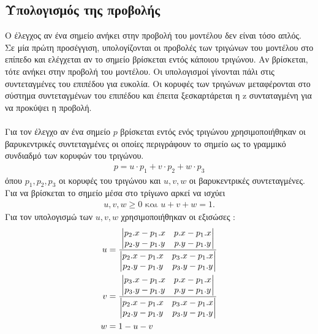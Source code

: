 \documentclass{report}
\begin{document}

\subsection{Υπολογισμός της προβολής}
Ο έλεγχος αν ένα σημείο ανήκει στην προβολή του μοντέλου δεν είναι τόσο απλός. Σε μία πρώτη προσέγγιση, υπολογίζονται οι προβολές των τριγώνων
του μοντέλου στο επίπεδο και ελέγχεται αν το σημείο βρίσκεται εντός κάποιου τριγώνου. Αν βρίσκεται, τότε ανήκει στην προβολή του μοντέλου.
Οι υπολογισμοί γίνονται πάλι στις συντεταγμένες του επιπέδου για ευκολία. Οι κορυφές των τριγώνων μεταφέρονται στο σύστημα συντεταγμένων
του επιπέδου και έπειτα ξεσκαρτάρεται η z συνταταγμένη για να προκύψει η προβολή.
\\\\
Για τον έλεγχο αν ένα σημείο $p$ βρίσκεται εντός ενός τριγώνου χρησιμοποιήθηκαν οι βαρυκεντρικές συντεταγμένες οι οποίες περιγράφουν το
σημείο ως το γραμμικό συνδιαδμό των κορυφών του τριγώνου. 
\begin{align}
    p = u \cdot p_1 + v \cdot p_2 + w \cdot p_3
\end{align}
όπου $p_1, p_2, p_3$ οι κορυφές του τριγώνου και $u, v, w$ οι βαρυκεντρικές συντεταγμένες.\\
Για να βρίσκεται το σημείο μέσα στο τρίγωνο αρκεί να ισχύει 
\begin{align}
    u, v, w \geq 0 \text{ και } u + v + w = 1.
\end{align}
Για τον υπολογισμώ των $u, v, w$ χρησιμοποιήθηκαν οι εξισώσες \cite{barycentric-coordinates}:
\begin{align}\label{barycentric}
    u &= \frac{\begin{vmatrix} 
            p_2.x - p_1.x & p.x - p_1.x \\ 
            p_2.y - p_1.y & p.y - p_1.y 
        \end{vmatrix}}{
        \begin{vmatrix}
            p_2.x - p_1.x & p_3.x - p_1.x \\
            p_2.y - p_1.y & p_3.y - p_1.y
        \end{vmatrix}} \notag \\
    v &= \frac{\begin{vmatrix} 
            p_3.x - p_1.x & p.x - p_1.x \\ 
            p_3.y - p_1.y & p.y - p_1.y 
        \end{vmatrix}}{
        \begin{vmatrix}
            p_2.x - p_1.x & p_3.x - p_1.x \\
            p_2.y - p_1.y & p_3.y - p_1.y
        \end{vmatrix}} \notag \\
    w &= 1 - u - v
\end{align}
\end{document}
